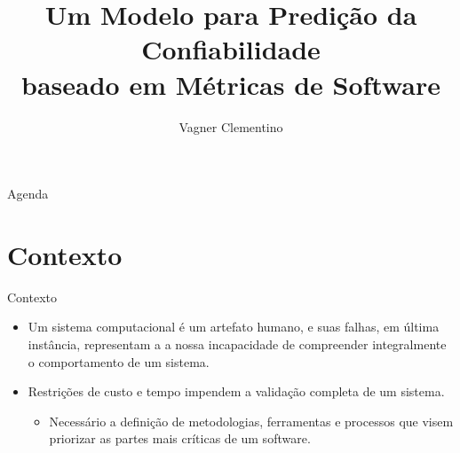 \documentclass[t,14pt,mathserif]{beamer}
\title[] %
{Um Modelo para Predição da Confiabilidade\\
baseado em Métricas de Software}
\subtitle{Vagner Clementino}
\institute[] %
{
  Departamento de Ciência da Computação\\
  Universidade Federal de Minas Gerais(UFMG)\\
  Software Quality and Measurement - 2015-1\\
  }
\date[2015/06/21] %
\begin{document}
\begin{frame}
  \titlepage
\end{frame}

\begin{frame}{Agenda}
  \tableofcontents
\end{frame}






\section{Contexto}

\begin{frame}{Contexto}
	\begin{itemize}
	

		\item Um sistema computacional é um artefato humano, e suas falhas, em última instância, representam a a nossa incapacidade de compreender integralmente o comportamento de um sistema\cite{Lyu:1996}.
	
		\item Restrições de custo e tempo impendem a validação completa de um sistema.
		
		\begin{itemize}
		
			\item Necessário a definição de metodologias, ferramentas e processos que visem priorizar as partes mais críticas de um software.
		\end{itemize}
	\end{itemize}
\end{frame}
\end{document}
